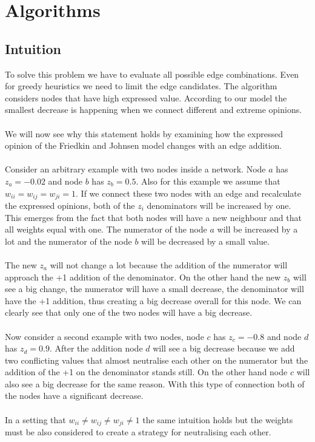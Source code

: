 \chapter{Algorithms}
\label{ch:algorithms}


\section{Intuition}
\label{sec:intuition}

To solve this problem we have to evaluate all possible edge combinations. Even for greedy heuristics we need to limit the edge candidates. The algorithm considers nodes that have high expressed value. According to our model the smallest decrease is happening when we connect different and extreme opinions.
\\
\\
We will now see why this statement holds by examining how the expressed opinion of the Friedkin and Johnsen model changes with an edge addition. 
\\
\\
Consider an arbitrary example with two nodes inside a network. Node $a$ has $z_a = -0.02$ and node $b$ has $z_b = 0.5$. Also for this example we assume that $w_{ii}=w_{ij}=w_{ji}=1$. If we connect these two nodes with an edge and recalculate the expressed opinions, both of the $z_i$ denominators will be increased by one. This emerges from the fact that both nodes will have a new neighbour and that all weights equal with one. The numerator of the node $a$ will be increased by a lot and the numerator of the node $b$ will be decreased by a small value.
\\
\\
The new $z_a$ will not change a lot because the addition of the numerator will approach the +1 addition of the denominator. On the other hand the new $z_b$ will see a big change, the numerator will have a small decrease, the denominator will have the +1 addition, thus creating a big decrease overall for this node. We can clearly see that only one of the two nodes will have a big decrease. 
\\
\\
Now consider a second example with two nodes, node $c$ has $z_c = -0.8$ and node $d$ has $z_d = 0.9$. After the addition node $d$ will see a big decrease because we add two conflicting values that almost neutralise each other on the numerator but the addition of the +1 on the denominator stands still. On the other hand node $c$ will also see a big decrease for the same reason. With this type of connection both of the nodes have a significant decrease.
\\
\\
In a setting that $w_{ii} \neq w_{ij} \neq w_{ji}\neq 1$ the same intuition holds but the weights must be also considered to create a strategy for neutralising each other.
 
